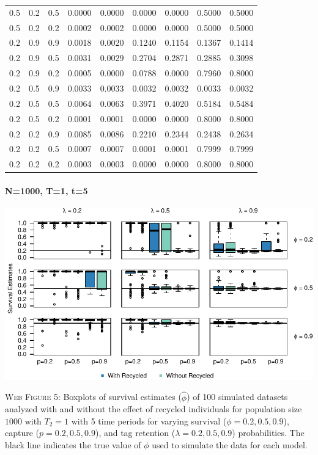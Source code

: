 \documentclass[]{article}
\let\oldparagraph\paragraph
\renewcommand{\paragraph}[1]{\oldparagraph{#1}\mbox{}}
\begin{document}
\begin{table}[ht]
{\begin{tabular}{rrrrrrrrr}
  0.5 & 0.2 & 0.5 & 0.0000 & 0.0000 & 0.0000 & 0.0000 & 0.5000 & 0.5000 \\ 
  0.5 & 0.2 & 0.2 & 0.0002 & 0.0002 & 0.0000 & 0.0000 & 0.5000 & 0.5000 \\ 
  0.2 & 0.9 & 0.9 & 0.0018 & 0.0020 & 0.1240 & 0.1154 & 0.1367 & 0.1414 \\ 
  0.2 & 0.9 & 0.5 & 0.0031 & 0.0029 & 0.2704 & 0.2871 & 0.2885 & 0.3098 \\ 
  0.2 & 0.9 & 0.2 & 0.0005 & 0.0000 & 0.0788 & 0.0000 & 0.7960 & 0.8000 \\ 
  0.2 & 0.5 & 0.9 & 0.0033 & 0.0033 & 0.0032 & 0.0032 & 0.0033 & 0.0032 \\ 
  0.2 & 0.5 & 0.5 & 0.0064 & 0.0063 & 0.3971 & 0.4020 & 0.5184 & 0.5484 \\ 
  0.2 & 0.5 & 0.2 & 0.0001 & 0.0001 & 0.0000 & 0.0000 & 0.8000 & 0.8000 \\ 
  0.2 & 0.2 & 0.9 & 0.0085 & 0.0086 & 0.2210 & 0.2344 & 0.2438 & 0.2634 \\ 
  0.2 & 0.2 & 0.5 & 0.0007 & 0.0007 & 0.0001 & 0.0001 & 0.7999 & 0.7999 \\ 
  0.2 & 0.2 & 0.2 & 0.0003 & 0.0003 & 0.0000 & 0.0000 & 0.8000 & 0.8000 \\ 
   \hline
\end{tabular}
}
\endgroup
\end{table}

\newpage

\paragraph{N=1000, T=1, t=5}\label{n1000-t1-t5}

\includegraphics{Appendix_files/figure-latex/figure5_survival_GJSTL5-1.pdf}

\textsc{Web Figure 5:} Boxplots of survival estimates (\(\hat{\phi}\))
of 100 simulated datasets analyzed with and without the effect of
recycled individuals for population size \(1000\) with \(T_2=1\) with 5
time periods for varying survival (\(\phi=0.2,0.5,0.9\)), capture
(\(p=0.2,0.5,0.9\)), and tag retention (\(\lambda=0.2,0.5,0.9\))
probabilities. The black line indicates the true value of \(\phi\) used
to simulate the data for each model.
\end{document}

